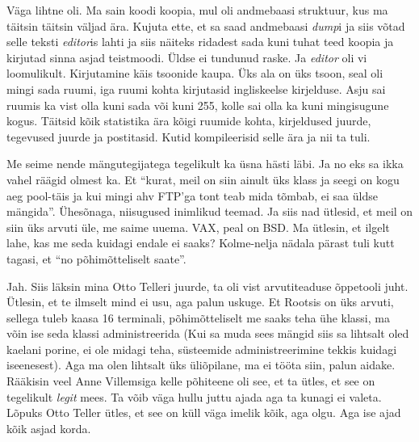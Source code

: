 
Väga lihtne oli. Ma sain koodi koopia, mul oli andmebaasi struktuur, kus ma 
täitsin täitsin väljad ära. Kujuta ette, et sa saad andmebaasi \emph{dump}i ja 
siis võtad selle teksti \emph{editor}is lahti ja siis  näiteks ridadest sada 
kuni tuhat teed koopia ja  kirjutad sinna asjad teistmoodi. Üldse ei tundunud 
raske. Ja \emph{editor} oli vi 
loomulikult. Kirjutamine käis tsoonide kaupa. Üks ala on üks tsoon, seal oli 
mingi sada ruumi, iga ruumi kohta kirjutasid ingliskeelse kirjelduse. Asju sai 
ruumis ka vist olla kuni sada või kuni 255, kolle sai olla ka kuni mingisugune 
kogus. Täitsid kõik statistika ära kõigi ruumide kohta, kirjeldused juurde, 
tegevused juurde ja postitasid. Kutid kompileerisid selle ära ja nii ta tuli. 

Me seime nende mängutegijatega tegelikult ka üsna hästi läbi. Ja no eks sa ikka 
vahel räägid olmest ka. Et \enquote{kurat, meil on siin ainult üks klass ja 
seegi  on kogu aeg pool-täis ja kui mingi ahv FTP'ga tont teab mida tõmbab, ei 
saa üldse mängida}. Ühesõnaga, niisugused inimlikud teemad. Ja siis nad ütlesid, 
et meil on siin üks arvuti üle, me saime uuema. VAX, peal on 
BSD. Ma ütlesin, et ilgelt lahe, kas me seda kuidagi endale ei 
saaks? Kolme-nelja nädala pärast tuli kutt tagasi, et \enquote{no 
põhimõtteliselt saate}. 


Jah. Siis läksin mina Otto Telleri juurde, ta oli vist 
arvutiteaduse õppetooli juht. Ütlesin, et te ilmselt mind ei usu, aga palun 
uskuge. Et Rootsis on üks arvuti, sellega tuleb kaasa 16 terminali, 
põhimõtteliselt me saaks teha ühe klassi, ma võin ise seda klassi 
administreerida (Kui sa muda sees mängid siis sa lihtsalt oled kaelani porine, 
ei ole midagi teha, süsteemide administreerimine tekkis  kuidagi iseenesest). 
Aga ma olen lihtsalt üks üliõpilane, ma ei tööta siin, palun aidake. Rääkisin 
veel Anne Villemsiga kelle põhiteene oli 
see, et ta ütles, et see on tegelikult \emph{legit} mees. Ta võib väga hullu 
juttu ajada aga ta kunagi ei valeta. Lõpuks Otto Teller ütles, et see on küll 
väga imelik kõik, aga olgu. Aga ise ajad kõik asjad korda.

